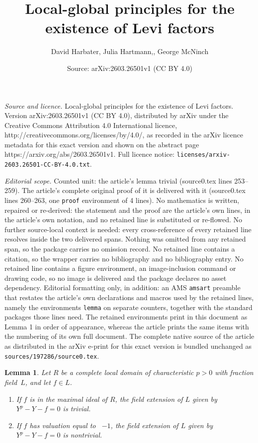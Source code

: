 \documentclass[10pt,a4paper]{amsart}
\title{Local-global principles for the existence of Levi factors}
\author{David Harbater, Julia Hartmann,, George McNinch}
\date{Source: arXiv:2603.26501v1 (CC BY 4.0)}
\newtheorem{lemma}{Lemma}
\begin{document}
\maketitle

\noindent\emph{Source and licence.} Local-global principles for the existence of Levi factors. Version arXiv:2603.26501v1 (CC BY 4.0), distributed by arXiv under the Creative Commons Attribution 4.0 International licence, http://creativecommons.org/licenses/by/4.0/, as recorded in the arXiv licence metadata for this exact version and shown on the abstract page https://arxiv.org/abs/2603.26501v1. Full licence notice: \texttt{licenses/arxiv-2603.26501-CC-BY-4.0.txt}.\par\smallskip

\noindent\textit{Editorial scope.} Counted unit: the article's lemma trivial (source0.tex lines 253--259). The article's complete original proof of it is delivered with it (source0.tex lines 260--263, one \texttt{proof} environment of 4 lines). No mathematics is written, repaired or re-derived: the statement and the proof are the article's own lines, in the article's own notation, and no retained line is substituted or re-flowed.  No further source-local context is needed: every cross-reference of every retained line resolves inside the two delivered spans.  Nothing was omitted from any retained span, so the package carries no omission record.  No retained line contains a citation, so the wrapper carries no bibliography and no bibliography entry.  No retained line contains a figure environment, an image-inclusion command or drawing code, so no image is delivered and the package declares no asset dependency.  Editorial formatting only, in addition: an AMS \texttt{amsart} preamble that restates the article's own declarations and macros used by the retained lines, namely the environments \texttt{lemma} on separate counters, together with the standard packages those lines need.  The retained environments print in this document as Lemma 1 in order of appearance, whereas the article prints the same items with the numbering of its own full document.  The complete native source of the article as distributed in the arXiv e-print for this exact version is bundled unchanged as \texttt{sources/197286/source0.tex}.
\begin{lemma}
Let $R$ be a complete local domain of characteristic $p>0$ with fraction field~$L$, and let $f\in L$. 
\begin{enumerate}
\item[(a)]\label{trivial} If $f$ is in the maximal ideal of $R$, the field extension of $L$ given by $Y^p-Y-f=0$ is trivial. 
\item[(b)]\label{nontrivial} If $f$ has valuation equal to ~$-1$, the field extension of $L$ given by $Y^p-Y-f=0$ is nontrivial. 
\end{enumerate}
\end{lemma}
\end{document}
